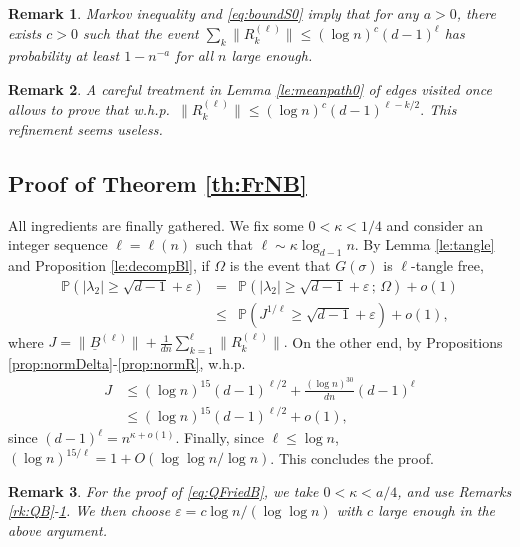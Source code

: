 \documentclass[11pt]{article}
\newtheorem{remark}{Remark}
\newcommand{\dP}{\mathbb{P}}
\newcommand{\PAR}[1]{{{\left(#1\right)}}} %
\newcommand{\uB}{{\underline B}}
\newcommand{\1}{1\!\!{\sf I}}\newcommand{\IND}{\1}
\newcommand{\veps}{\varepsilon}
\newcommand{\whp}{{w.h.p.~}}
\begin{document}
\begin{remark}\label{rk:QR} Markov inequality and \eqref{eq:boundS0}  imply that for any $a >0$, there exists $c >0$ such that the event $\sum_k \| R_k^{(\ell)} \| \leq  ( \log n) ^{c} \PAR{ d -1} ^{\ell}$ has probability at least $1 - n^{-a}$ for all $n$ large enough.
\end{remark}

\begin{remark}\label{rk:IR}
A careful treatment in Lemma \ref{le:meanpath0} of edges visited once allows to prove that \whp $ \| R^{(\ell)}_{k} \| \leq ( \log n) ^{c}\PAR{ d - 1}^{\ell - k/2}.$ This refinement seems useless.
\end{remark}
\subsection{Proof of Theorem \ref{th:FrNB}}

\label{subsec:end}

All ingredients are finally gathered.  We fix some $0 < \kappa < 1/4$ and consider an integer sequence $\ell = \ell(n)$ such that $\ell \sim \kappa \log_{d-1} n$. By Lemma \ref{le:tangle} and Proposition \ref{le:decompBl}, if $\Omega$ is the event that $G(\sigma)$ is $\ell$-tangle free, 
\begin{eqnarray*}
\dP \PAR{|\lambda_2 | \geq \sqrt {d-1} + \veps } & = &\dP \PAR{|\lambda_2 | \geq \sqrt {d-1} + \veps \, ; \, \Omega} + o(1) \\
& \leq & \dP \PAR{ J^ { 1 /  \ell}  \geq   \sqrt {d-1} + \veps  } + o(1), 
\end{eqnarray*}
where $J = \|  \uB^{(\ell)} \|   +  \frac 1{d n}   \sum_{k = 1}^\ell \| R^{(\ell)}_{k} \|.$
On the other end, by Propositions \ref{prop:normDelta}-\ref{prop:normR}, \whp
\begin{align*}
J  &\leq ( \log n )^{15} (d-1)^{\ell/2}   +  \frac {(\log n)^{30} } {d n}  \PAR{ d - 1}^{\ell} \\
&\leq ( \log n )^{15} (d-1)^{\ell/2} + o(1),
\end{align*} since $(d-1)^\ell = n^{\kappa+o(1)} $. Finally, since $\ell \leq \log n$, $(\log n)^{15 / \ell} = 1 + O ( \log \log n / \log n )$. This concludes the proof. 


\begin{remark}
For the proof of \eqref{eq:QFriedB}, we take  $0< \kappa < a/4$, and use Remarks \ref{rk:QB}-\ref{rk:QR}. We then choose $\veps = c \log n /(\log \log n)$ with $c$ large enough in the above argument. 
\end{remark}
\end{document}
